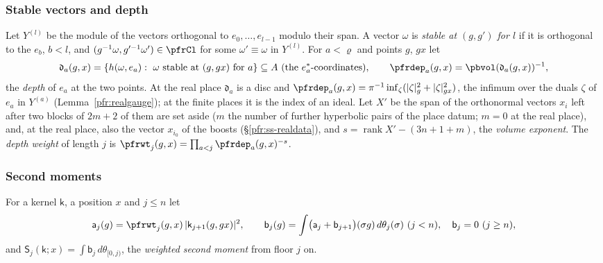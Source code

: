 \documentclass[10pt]{amsart}
\theoremstyle{definition}
\theoremstyle{remark}
\begin{document}
\subsubsection*{Stable vectors and depth}
Let $Y^{(l)}$ be the module of the vectors orthogonal to $e_0,\dots,e_{l-1}$ modulo their span. A
vector $\omega$ is \emph{stable at $(g,g')$ for $l$} if it is orthogonal to the $e_b$, $b<l$, and
$(g^{-1}\omega,g'^{-1}\omega')\in\pfrCl$ for some $\omega'\equiv\omega$ in $Y^{(l)}$. For $a<\varrho$ and
points $g$, $gx$ let
\[
\mathfrak d_a(g,x)=\{h(\omega,e_a):\ \omega\text{ stable at }(g,gx)
\text{ for }a\}\subseteq A\ \text{(the $e_a^*$-coordinates)},\qquad\pfrdep_a(g,x)=\pbvol(\mathfrak d_a(g,x))^{-1},
\]
the \emph{depth} of $e_a$ at the two points. At the real place $\mathfrak d_a$ is a disc and
$\pfrdep_a(g,x)=\pi^{-1}\inf_\zeta(|\zeta|_g^2+|\zeta|_{gx}^2)$, the infimum over the duals $\zeta$ of
$e_a$ in $Y^{(a)}$ (Lemma~\ref{pfr:realgauge}); at the finite places it is the index of an ideal.
Let $X'$ be the span of the orthonormal vectors $x_i$ left after two blocks of $2m+2$ of them are set
aside ($m$ the number of further hyperbolic pairs of the place datum; $m=0$ at the real place), and, at
the real place, also the vector $x_{i_0}$ of the boosts (\S\ref{pfr:ss-realdata}), and
$s=\operatorname{rank}X'-(3n+1+m)$, the \emph{volume exponent}. The \emph{depth weight} of length $j$ is
$\pfrwt_j(g,x)=\prod_{a<j}\pfrdep_a(g,x)^{-s}$.

\subsubsection*{Second moments}
For a kernel $\mathsf k$, a position $x$ and $j\le n$ let
\[
\mathsf a_j(g)=\pfrwt_j(g,x)\,|\mathsf k_{j+1}(g,gx)|^2,\qquad
\mathsf b_j(g)=\int\bigl(\mathsf a_j+\mathsf b_{j+1}\bigr)(\sigma g)\,d\theta_j(\sigma)\ (j<n),\quad
\mathsf b_j=0\ (j\ge n),
\]
and $\mathsf S_j(\mathsf k;x)=\int\mathsf b_j\,d\theta_{[0,j)}$, the \emph{weighted second moment} from
floor $j$ on.
\end{document}
